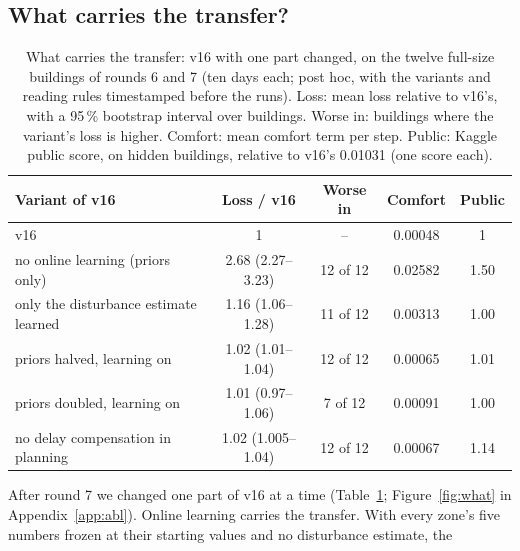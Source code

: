 \documentclass{article}
\begin{document}
\subsection{What carries the transfer?}\label{sec:what}
\begin{table}[t]\centering
\caption{What carries the transfer: v16 with one part changed, on the twelve full-size buildings of rounds 6 and 7
(ten days each; post hoc, with the variants and reading rules timestamped before the runs). Loss: mean loss relative
to v16's, with a 95\,\% bootstrap interval over buildings. Worse in: buildings where the variant's loss is higher.
Comfort: mean comfort term per step. Public: Kaggle public
score, on hidden buildings, relative to v16's 0.01031 (one score each).}\label{tab:what}
\small
\begin{tabular}{lcccc}\toprule
Variant of v16 & Loss / v16 & Worse in & Comfort & Public\\\midrule
v16 & 1 & -- & 0.00048 & 1\\
no online learning (priors only) & 2.68 (2.27--3.23) & 12 of 12 & 0.02582 & 1.50\\
only the disturbance estimate learned & 1.16 (1.06--1.28) & 11 of 12 & 0.00313 & 1.00\\
priors halved, learning on & 1.02 (1.01--1.04) & 12 of 12 & 0.00065 & 1.01\\
priors doubled, learning on & 1.01 (0.97--1.06) & 7 of 12 & 0.00091 & 1.00\\
no delay compensation in planning & 1.02 (1.005--1.04) & 12 of 12 & 0.00067 & 1.14\\\bottomrule
\end{tabular}
\end{table}
After round 7 we changed one part of v16 at a time (Table~\ref{tab:what}; Figure~\ref{fig:what} in
Appendix~\ref{app:abl}). Online learning carries the transfer. With every zone's five numbers frozen at their starting values and no disturbance estimate, the
\end{document}
